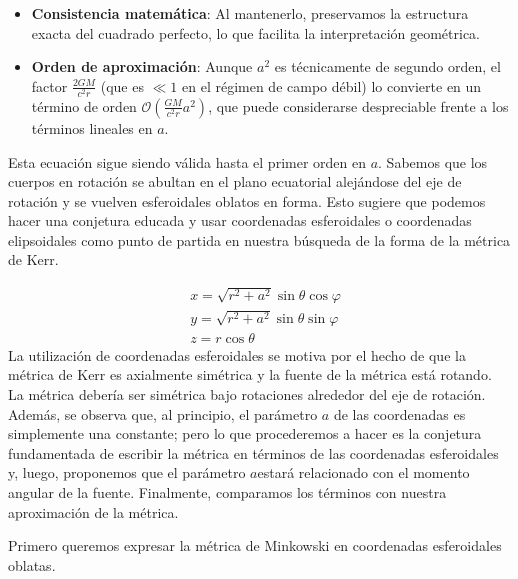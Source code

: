 \begin{itemize}
    \item \textbf{Consistencia matemática}: Al mantenerlo, preservamos la estructura exacta del cuadrado perfecto, lo que facilita la interpretación geométrica.

    \item \textbf{Orden de aproximación}: Aunque $a^2$ es técnicamente de segundo orden, el factor $\frac{2GM}{c^2r}$ (que es $\ll1$ en el régimen de campo débil) lo convierte en un término de orden $\mathcal{O}\left(\frac{GM}{c^2r}a^2\right)$, que puede considerarse despreciable frente a los términos lineales en $a$.
\end{itemize}
Esta ecuación sigue siendo válida hasta el primer orden en $a$.
Sabemos que los cuerpos en rotación se abultan en el plano ecuatorial alejándose del eje de rotación y se vuelven esferoidales oblatos en forma. Esto sugiere que podemos hacer una conjetura educada y usar coordenadas esferoidales o coordenadas elipsoidales como punto de partida en nuestra búsqueda de la forma de la métrica de Kerr.

\begin{align}
     & x=\sqrt{r^2+a^2} \sin \theta \cos \varphi \\
     & y=\sqrt{r^2+a^2} \sin \theta \sin \varphi \\
     & z=r \cos \theta
\end{align}
La utilización de coordenadas esferoidales se motiva por el hecho de que la métrica de Kerr es axialmente simétrica y la fuente de la métrica está rotando. La métrica debería ser simétrica bajo rotaciones alrededor del eje de rotación. Además, se observa que, al principio, el parámetro $a$ de las coordenadas es simplemente una constante; pero lo que procederemos a hacer es la conjetura fundamentada de escribir la métrica en términos de las coordenadas esferoidales y, luego, proponemos que el parámetro $a $estará relacionado con el momento angular de la fuente. Finalmente, comparamos los términos con nuestra aproximación de la métrica.

Primero queremos expresar la métrica de Minkowski en coordenadas esferoidales oblatas.

